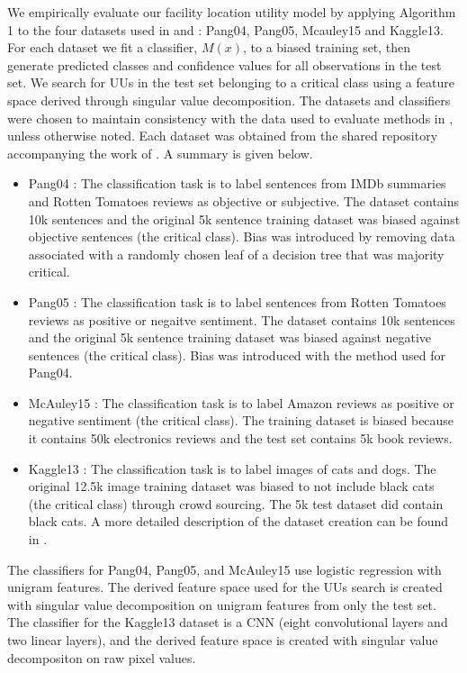 \documentclass[letterpaper]{article} %
\newcommand{\wdb}[1]{{\color{blue} #1}} %
\begin{document}
\wdb{We empirically evaluate our facility location utility model by applying Algorithm 1 to the four datasets used in \cite{Lakkaraju2016} and \cite{Bansal2018}: Pang04, Pang05, Mcauley15 and Kaggle13.  For each dataset we fit a classifier, $M(x)$, to a biased training set, then generate predicted classes and confidence values for all observations in the test set.  We search for UUs in the test set belonging to a critical class using a feature space derived through singular value decomposition.  The datasets and classifiers were chosen to maintain consistency with the data used to evaluate methods in \citep{Bansal2018}, unless otherwise noted. Each dataset was obtained from the shared repository accompanying the work of \cite{Bansal2018}.  A summary is given below.    

\begin{itemize}
\item Pang04 \citep{pang2004}: The classification task is to label sentences from IMDb summaries and Rotten Tomatoes reviews as objective or subjective.  The dataset contains 10k sentences and the original 5k sentence training dataset was biased against objective sentences (the critical class). Bias was introduced by removing data associated with a randomly chosen leaf of a decision tree that was majority critical.  
\item Pang05 \citep{pang2005}: The classification task is to label sentences from Rotten Tomatoes reviews as positive or negaitve sentiment.  The dataset contains 10k sentences and the original 5k sentence training dataset was biased against negative sentences (the critical class). Bias was introduced with the method used for Pang04.  
\item McAuley15 \citep{mcauley2015}: The classification task is to label Amazon reviews as positive or negative sentiment (the critical class). The training dataset is biased because it contains 50k electronics reviews and the test set contains 5k book reviews.
\item Kaggle13 \citep{kaggle2013}: The classification task is to label images of cats and dogs.  The original 12.5k image training dataset was biased to not include black cats (the critical class) through crowd sourcing. The 5k test dataset did contain black cats. A more detailed description of the dataset creation can be found in \cite{Bansal2018}.
\end{itemize}

The classifiers for Pang04, Pang05, and McAuley15 use logistic regression with unigram features. The derived feature space used for the UUs search is created with singular value decomposition on unigram features from only the test set. The classifier for the Kaggle13 dataset is a CNN (eight convolutional layers and two linear layers), and the derived feature space is created with singular value decompositon on raw pixel values.
}
\end{document}
